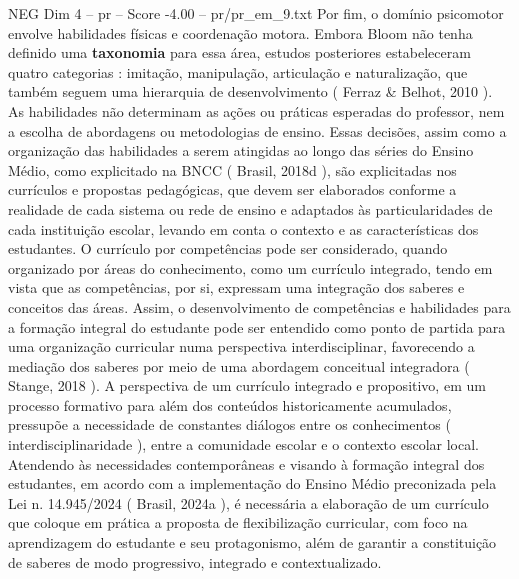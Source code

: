 \begin{textsample}{NEG Dim 4 – pr – Score -4.00 – pr/pr\_em\_9.txt}
Por fim, o domínio psicomotor envolve habilidades físicas e coordenação motora.
Embora Bloom não tenha definido uma \textbf{taxonomia} para essa área, estudos posteriores estabeleceram quatro categorias : imitação, manipulação, articulação e naturalização, que também seguem uma hierarquia de desenvolvimento ( Ferraz \& Belhot, 2010 ).
As habilidades não determinam as ações ou práticas esperadas do professor, nem a escolha de abordagens ou metodologias de ensino.
Essas decisões, assim como a organização das habilidades a serem atingidas ao longo das séries do Ensino Médio, como explicitado na BNCC ( Brasil, 2018d ), são explicitadas nos currículos e propostas pedagógicas, que devem ser elaborados conforme a realidade de cada sistema ou rede de ensino e adaptados às particularidades de cada instituição escolar, levando em conta o contexto e as características dos estudantes.
O currículo por competências pode ser considerado, quando organizado por áreas do conhecimento, como um currículo integrado, tendo em vista que as competências, por si, expressam uma integração dos saberes e conceitos das áreas.
Assim, o desenvolvimento de competências e habilidades para a formação integral do estudante pode ser entendido como ponto de partida para uma organização curricular numa perspectiva interdisciplinar, favorecendo a mediação dos saberes por meio de uma abordagem conceitual integradora ( Stange, 2018 ).
A perspectiva de um currículo integrado e propositivo, em um processo formativo para além dos conteúdos historicamente acumulados, pressupõe a necessidade de constantes diálogos entre os conhecimentos ( interdisciplinaridade ), entre a comunidade escolar e o contexto escolar local.
Atendendo às necessidades contemporâneas e visando à formação integral dos estudantes, em acordo com a implementação do Ensino Médio preconizada pela Lei n. 14.945/2024 ( Brasil, 2024a ), é necessária a elaboração de um currículo que coloque em prática a proposta de flexibilização curricular, com foco na aprendizagem do estudante e seu protagonismo, além de garantir a constituição de saberes de modo progressivo, integrado e contextualizado.

\end{textsample}
